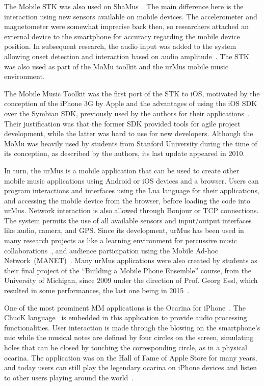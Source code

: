 The Mobile STK was also used on ShaMus~\citep{Essl2007shamus}.
The main difference here is the interaction using new sensors available on mobile devices.
The accelerometer and magnetometer were somewhat imprecise back then, so researchers attached an external device to the smartphone for accuracy regarding the mobile device position.
In subsequent research, the audio input was added to the system allowing onset detection and interaction based on audio amplitude~\citep{Misra2008microphone}. 
The STK was also used as part of the MoMu toolkit and the urMus mobile music environment. 

The Mobile Music Toolkit was the first port of the STK to iOS, motivated by the conception of the iPhone 3G by Apple and the advantages of using the iOS SDK over the Symbian SDK, previously used by the authors for their applications~\citep{Bryan2010momu}.
Their justification was that the former SDK provided tools for agile project development, while the latter was hard to use for new developers.
Although the MoMu was heavily used by students from Stanford University during the time of its conception, as described by the authors, its last update appeared in 2010.

In turn, the urMus is a mobile application that can be used to create other mobile music applications using Android or iOS devices and a browser.
Users can program interactions and interfaces using the Lua language for their applications, and accessing the mobile device from the browser, before loading the code into urMus.
Network interaction is also allowed through Bonjour or TCP connections. 
The system permits the use of all available sensors and input/output interfaces like audio, camera, and GPS.
Since its development, urMus has been used in many research projects as like a learning environment for percussive music collaborations~\citep{Derbinsky2012exploring}, and audience participation using the Mobile Ad-hoc Network~(MANET)~\citep{Lee2014manet}.
Many urMus applications were also created by students as their final project of the ``Building a Mobile Phone Ensemble'' course, from the University of Michigan, since 2009 under the direction of Prof. Georg Essl, which resulted in some performances, the last one being in 2015~\citep{Michigan2017mobilephoneensempleperformance}.

One of the most prominent MM applications is the Ocarina for iPhone~\citep{Wang2008domobilephones}.
The ChucK language~\citep{wang2003chuck} is embedded in this application to provide audio processing functionalities.
User interaction is made through the blowing on the smartphone's mic while the musical notes are defined by four circles on the screen, simulating holes that can be closed by touching the corresponding circle, as in a physical ocarina.
The application was on the Hall of Fame of Apple Store for many years, and today users can still play the legendary ocarina on iPhone devices and listen to other users playing around the world~\citep{Wang2014ocarina}. 

